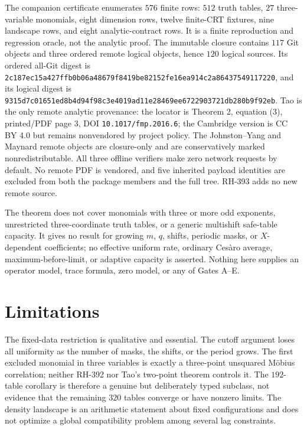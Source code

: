 \documentclass[11pt]{article}
\theoremstyle{definition}
\theoremstyle{remark}
\begin{document}
The companion certificate enumerates \(576\) finite rows: \(512\) truth
tables, \(27\) three-variable monomials, eight dimension rows, twelve
finite-CRT fixtures, nine landscape rows, and eight analytic-contract rows.
It is a finite reproduction and regression oracle, not the analytic proof.
The immutable closure contains \(117\) Git objects and three ordered remote
logical objects, hence \(120\) logical sources.  Its ordered all-Git digest
is
\nolinkurl{2c187ec15a427ffb0b06a48679f8419be82152fe16ea914c2a86437549117220},
and its logical digest is
\nolinkurl{9315d7c01651ed8b4d94f98c3e4019ad11e28469ee6722903721db280b9f92eb}.
Tao is the only remote analytic provenance: the locator is Theorem 2,
equation (3), printed/PDF page 3, DOI \nolinkurl{10.1017/fmp.2016.6}; the
Cambridge version is CC BY 4.0 but remains nonvendored by project policy.
The Johnston--Yang and Maynard remote objects are closure-only and are
conservatively marked nonredistributable.  All three offline verifiers make
zero network requests by default.  No remote PDF is vendored, and five
inherited payload identities are excluded from both the package members and
the full tree.  RH-393 adds no new remote source.

The theorem does not cover monomials with three or more odd exponents,
unrestricted three-coordinate truth tables, or a generic multishift
safe-table capacity.  It gives no result for growing \(m\), \(q\), shifts,
periodic masks, or \(X\)-dependent coefficients; no effective uniform
rate, ordinary Ces\`aro average, maximum-before-limit, or adaptive capacity
is asserted.  Nothing here supplies an operator model, trace formula, zero
model, or any of Gates A--E.

\section{Limitations}

The fixed-data restriction is qualitative and essential.  The cutoff
argument loses all uniformity as the number of masks, the shifts, or the
period grows.  The first excluded monomial in three variables is exactly a
three-point unsquared M\"obius correlation; neither RH-392 nor Tao's
two-point theorem controls it.  The \(192\)-table corollary is therefore a
genuine but deliberately typed subclass, not evidence that the remaining
\(320\) tables converge or have nonzero limits.  The density landscape is
an arithmetic statement about fixed configurations and does not optimize a
global compatibility problem among several lag constraints.
\end{document}
